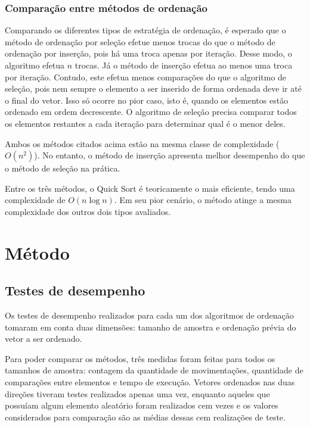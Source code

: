 \documentclass[
]{article}
\begin{document}
\hypertarget{comparauxe7uxe3o-entre-muxe9todos-de-ordenauxe7uxe3o}{%
\subsubsection{Comparação entre métodos de
ordenação}\label{comparauxe7uxe3o-entre-muxe9todos-de-ordenauxe7uxe3o}}

Comparando os diferentes tipos de estratégia de ordenação, é esperado
que o método de ordenação por seleção efetue menos trocas do que o
método de ordenação por inserção, pois há uma troca apenas por iteração.
Desse modo, o algoritmo efetua \(n\) trocas. Já o método de inserção
efetua ao menos uma troca por iteração. Contudo, este efetua menos
comparações do que o algoritmo de seleção, pois nem sempre o elemento a
ser inserido de forma ordenada deve ir até o final do vetor. Isso só
ocorre no pior caso, isto é, quando os elementos estão ordenado em ordem
decrescente. O algoritmo de seleção precisa comparar todos os elementos
restantes a cada iteração para determinar qual é o menor deles.

Ambos os métodos citados acima estão na mesma classe de complexidade
(\(O(n^2)\)). No entanto, o método de inserção apresenta melhor
desempenho do que o método de seleção na prática.

Entre os três métodos, o Quick Sort é teoricamente o mais eficiente,
tendo uma complexidade de \(O(n \log n)\). Em seu pior cenário, o método
atinge a mesma complexidade dos outros dois tipos avaliados.

\hypertarget{muxe9todo}{%
\section{Método}\label{muxe9todo}}

\hypertarget{testes-de-desempenho}{%
\subsection{Testes de desempenho}\label{testes-de-desempenho}}

Os testes de desempenho realizados para cada um dos algoritmos de
ordenação tomaram em conta duas dimensões: tamanho de amostra e
ordenação prévia do vetor a ser ordenado.

Para poder comparar os métodos, três medidas foram feitas para todos os
tamanhos de amostra: contagem da quantidade de movimentações, quantidade
de comparações entre elementos e tempo de execução. Vetores ordenados
nas duas direções tiveram testes realizados apenas uma vez, enquanto
aqueles que possuíam algum elemento aleatório foram realizados cem vezes
e os valores considerados para comparação são as médias dessas cem
realizações de teste.
\end{document}
